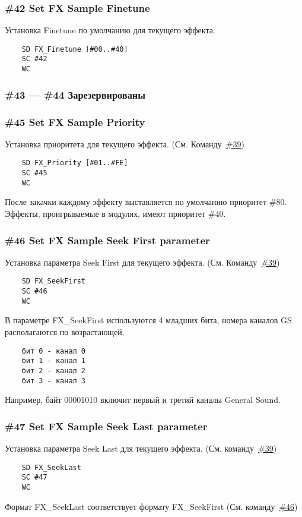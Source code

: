\documentclass[a4paper,11pt]{article}
\begin{document}
\subsubsection{\#42 Set FX Sample Finetune\label{cmd:42}}
Установка Finetune по умолчанию для текущего эффекта.
\begin{verbatim}
    SD FX_Finetune [#00..#40]
    SC #42
    WC
\end{verbatim}

\subsubsection{\#43 --- \#44 Зарезервированы}
\subsubsection{\#45 Set FX Sample Priority\label{cmd:45}}

Установка приоритета для текущего эффекта. (См. Команду~\hyperref[cmd:39]{\#39})
\begin{verbatim}
    SD FX_Priority [#01..#FE]
    SC #45
    WC
\end{verbatim}

После закачки каждому эффекту выставляется по умолчанию приоритет \#80. Эффекты, проигрываемые в модулях, имеют приоритет \#40.

\subsubsection{\#46 Set FX Sample Seek First parameter\label{cmd:46}}
Установка параметра Seek First для текущего эффекта. (См. Команду~\hyperref[cmd:39]{\#39})
\begin{verbatim}
    SD FX_SeekFirst
    SC #46
    WC
\end{verbatim}

В параметре FX\_SeekFirst используются 4 младших бита, номера каналов GS располагаются по возрастающей.
\begin{verbatim}
	бит 0 - канал 0
	бит 1 - канал 1
	бит 2 - канал 2
	бит 3 - канал 3
\end{verbatim}

Например, байт 00001010 включит первый и третий каналы General Sound.

\subsubsection{\#47 Set FX Sample Seek Last parameter\label{cmd:47}}
Установка параметра Seek Last для текущего эффекта. (См. команду~\hyperref[cmd:39]{\#39})
\begin{verbatim}
    SD FX_SeekLast
    SC #47
    WC
\end{verbatim}
Формат FX\_SeekLast соответствует формату FX\_SeekFirst (См. команду~\hyperref[cmd:46]{\#46})
\end{document}
